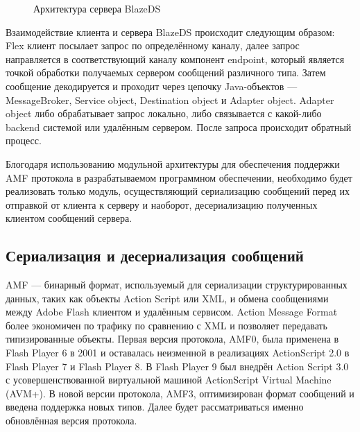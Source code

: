 \begin{figure}[ht]
\caption{Архитектура сервера BlazeDS}
\label{ris:blazeDSServer.png}
\end{figure}

Взаимодействие клиента и сервера BlazeDS происходит следующим образом:
Flex клиент посылает запрос по определённому каналу, далее запрос направляется в соответствующий каналу
компонент endpoint, который является точкой обработки получаемых сервером сообщений различного типа. Затем сообщение
декодируется и проходит через цепочку Java-объектов --- MessageBroker, Service object, Destination object и Adapter object.
Adapter object либо обрабатывает запрос локально, либо связывается с какой-либо backend системой или
удалённым сервером. После запроса происходит обратный процесс.
 
Блогодаря использованию модульной архитектуры для обеспечения поддержки AMF протокола в разрабатываемом
программном обеспечении, необходимо будет реализовать только модуль, осуществляющий сериализацию сообщений
перед их отправкой от клиента к серверу и наоборот, десериализацию полученных клиентом сообщений 
сервера.

\subsection{Сериализация и десериализация сообщений}

AMF --- бинарный формат, используемый для сериализации структурированных данных, таких как объекты Action Script или
XML, и обмена сообщениями между Adobe Flash клиентом и удалённым сервисом\cite{amf}. Action Message Format более экономичен
по трафику по сравнению с XML и позволяет передавать типизированные объекты. Первая версия протокола, AMF0, была 
применена в Flash Player 6 в 2001 и оставалась неизменной в реализациях ActionScript 2.0 в Flash Player 7 и Flash 
Player 8. В Flash Player 9 был внедрён Action Script 3.0 с усовершенствованной виртуальной машиной 
ActionScript Virtual Machine (AVM+). В новой версии протокола, AMF3, оптимизирован формат сообщений и введена 
поддержка новых типов. Далее будет рассматриваться именно обновлённая версия протокола.

